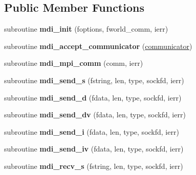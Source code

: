 \subsection*{Public Member Functions}
\begin{DoxyCompactItemize}
\item 
\hypertarget{classmdi_a35894bce734c441b9937f571436443b9}{subroutine {\bfseries mdi\-\_\-init} (foptions, fworld\-\_\-comm, ierr)}\label{classmdi_a35894bce734c441b9937f571436443b9}

\item 
\hypertarget{classmdi_a614089c34c2781079993f86374ee6d93}{subroutine {\bfseries mdi\-\_\-accept\-\_\-communicator} (\hyperlink{structcommunicator__struct}{communicator})}\label{classmdi_a614089c34c2781079993f86374ee6d93}

\item 
\hypertarget{classmdi_a127a7303cd7217c0d0d646e10b188f39}{subroutine {\bfseries mdi\-\_\-mpi\-\_\-comm} (comm, ierr)}\label{classmdi_a127a7303cd7217c0d0d646e10b188f39}

\item 
\hypertarget{classmdi_a83a8409162740c37f82776526e19d4cf}{subroutine {\bfseries mdi\-\_\-send\-\_\-s} (fstring, len, type, sockfd, ierr)}\label{classmdi_a83a8409162740c37f82776526e19d4cf}

\item 
\hypertarget{classmdi_ad5a7755632e8712b6d5609e2486b184a}{subroutine {\bfseries mdi\-\_\-send\-\_\-d} (fdata, len, type, sockfd, ierr)}\label{classmdi_ad5a7755632e8712b6d5609e2486b184a}

\item 
\hypertarget{classmdi_a57bcbe45a8445f19b02126f904b43774}{subroutine {\bfseries mdi\-\_\-send\-\_\-dv} (fdata, len, type, sockfd, ierr)}\label{classmdi_a57bcbe45a8445f19b02126f904b43774}

\item 
\hypertarget{classmdi_a9451f9ead8226273424cb7efbef245c3}{subroutine {\bfseries mdi\-\_\-send\-\_\-i} (fdata, len, type, sockfd, ierr)}\label{classmdi_a9451f9ead8226273424cb7efbef245c3}

\item 
\hypertarget{classmdi_add16db0836d8e0f3cfe310e175e8243c}{subroutine {\bfseries mdi\-\_\-send\-\_\-iv} (fdata, len, type, sockfd, ierr)}\label{classmdi_add16db0836d8e0f3cfe310e175e8243c}

\item 
\hypertarget{classmdi_a78af4fc262563d2d8820a3a7cbfe0a92}{subroutine {\bfseries mdi\-\_\-recv\-\_\-s} (fstring, len, type, sockfd, ierr)}\label{classmdi_a78af4fc262563d2d8820a3a7cbfe0a92}


\end{DoxyCompactItemize}
